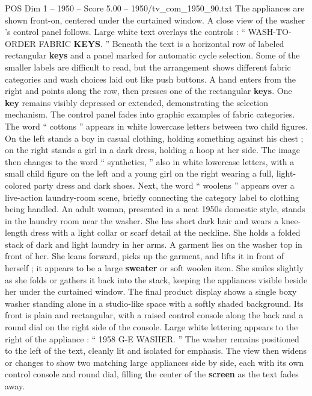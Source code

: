 \begin{textsample}{POS Dim 1 – 1950 – Score 5.00 – 1950/tv\_com\_1950\_90.txt}
The appliances are shown front-on, centered under the curtained window.
A close view of the washer ’s control panel follows.
Large white text overlays the controls : “ WASH-TO-ORDER FABRIC \textbf{KEYS}. ” Beneath the text is a horizontal row of labeled rectangular \textbf{keys} and a panel marked for automatic cycle selection.
Some of the smaller labels are difficult to read, but the arrangement shows different fabric categories and wash choices laid out like push buttons.
A hand enters from the right and points along the row, then presses one of the rectangular \textbf{keys}.
One \textbf{key} remains visibly depressed or extended, demonstrating the selection mechanism.
The control panel fades into graphic examples of fabric categories.
The word “ cottons ” appears in white lowercase letters between two child figures.
On the left stands a boy in casual clothing, holding something against his chest ; on the right stands a girl in a dark dress, holding a hoop at her side.
The image then changes to the word “ synthetics, ” also in white lowercase letters, with a small child figure on the left and a young girl on the right wearing a full, light-colored party dress and dark shoes.
Next, the word “ woolens ” appears over a live-action laundry-room scene, briefly connecting the category label to clothing being handled.
An adult woman, presented in a neat 1950s domestic style, stands in the laundry room near the washer.
She has short dark hair and wears a knee-length dress with a light collar or scarf detail at the neckline.
She holds a folded stack of dark and light laundry in her arms.
A garment lies on the washer top in front of her.
She leans forward, picks up the garment, and lifts it in front of herself ; it appears to be a large \textbf{sweater} or soft woolen item.
She smiles slightly as she folds or gathers it back into the stack, keeping the appliances visible beside her under the curtained window.
The final product display shows a single boxy washer standing alone in a studio-like space with a softly shaded background.
Its front is plain and rectangular, with a raised control console along the back and a round dial on the right side of the console.
Large white lettering appears to the right of the appliance : “ 1958 G-E WASHER. ” The washer remains positioned to the left of the text, cleanly lit and isolated for emphasis.
The view then widens or changes to show two matching large appliances side by side, each with its own control console and round dial, filling the center of the \textbf{screen} as the text fades away.

\end{textsample}
